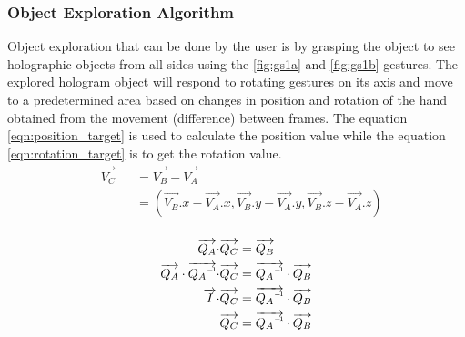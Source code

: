 \documentclass[conference]{IEEEtran}
\newcommand\inv[1]{#1\raisebox{1.15ex}{$\scriptscriptstyle-\!1$}}
\DeclareRobustCommand{\uvec}[1]{{%
		\ifcsname uvec#1\endcsname
		\csname uvec#1\endcsname
		\else
		\bm{\hat{\mathbf{#1}}}%
		\fi
}}
\begin{document}
	\subsubsection{Object Exploration Algorithm}
		Object exploration that can be done by the user is by grasping the object to see holographic objects from all sides using the \ref{fig:gs1a} and \ref{fig:gs1b} gestures. The explored hologram object will respond to rotating gestures on its axis and move to a predetermined area based on changes in position and rotation of the hand obtained from the movement (difference) between frames. The equation \ref{eqn:position_target} is used to calculate the position value while the equation \ref{eqn:rotation_target} is to get the rotation value.
					\vspace{-2ex}			
		\begin{equation}
		\begin{alignedat}{2}
		& \overrightarrow{V_{C}} &&= \overrightarrow{V_{B}} - \overrightarrow{V_{A}}\\
		& 		&&= (\overrightarrow{V_{B}}.x - \overrightarrow{V_{A}}.x, \overrightarrow{V_{B}}.y - \overrightarrow{V_{A}}.y, \overrightarrow{V_{B}}.z - \overrightarrow{V_{A}}.z)\\
		\end{alignedat}
		\label{eqn:position_target}
		\end{equation}
		
		\begin{equation}
		\begin{alignedat}{3}
		\overrightarrow{Q_{A}} \cdot & \overrightarrow{Q_{C}} &&= \overrightarrow{Q_{B}}\\ 
		\overrightarrow{Q_{A}} \cdot \overrightarrow{\inv{Q_{A}}} \cdot& \overrightarrow{Q_{C}} &&= \overrightarrow{\inv{Q_{A}}} \cdot \overrightarrow{Q_{B}}\\
		\overrightarrow{I} \cdot & \overrightarrow{Q_{C}} &&= \overrightarrow{\inv{Q_{A}}} \cdot \overrightarrow{Q_{B}}\\
		&\overrightarrow{Q_{C}} &&= \overrightarrow{\inv{Q_{A}}} \cdot \overrightarrow{Q_{B}}\\
		\end{alignedat}
		\label{eqn:rotation_target}
		\end{equation}
	
\end{document}
